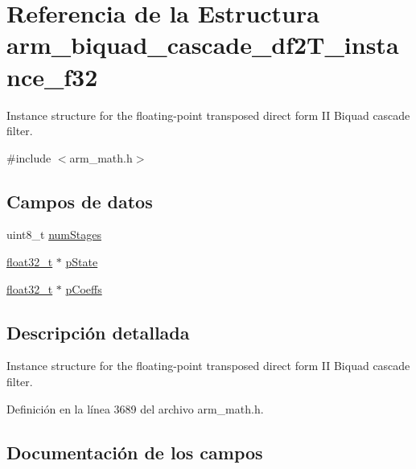 \hypertarget{structarm__biquad__cascade__df2_t__instance__f32}{}\section{Referencia de la Estructura arm\+\_\+biquad\+\_\+cascade\+\_\+df2\+T\+\_\+instance\+\_\+f32}
\label{structarm__biquad__cascade__df2_t__instance__f32}


Instance structure for the floating-\/point transposed direct form II Biquad cascade filter.  




{\ttfamily \#include $<$arm\+\_\+math.\+h$>$}

\subsection*{Campos de datos}
\begin{DoxyCompactItemize}
\item 
uint8\+\_\+t \hyperlink{structarm__biquad__cascade__df2_t__instance__f32_a3615af038f56917909e0370c11bc2ec7}{num\+Stages}
\item 
\hyperlink{arm__math_8h_a4611b605e45ab401f02cab15c5e38715}{float32\+\_\+t} $\ast$ \hyperlink{structarm__biquad__cascade__df2_t__instance__f32_a335c87e6fdc4b96601d95a5de8b9c463}{p\+State}
\item 
\hyperlink{arm__math_8h_a4611b605e45ab401f02cab15c5e38715}{float32\+\_\+t} $\ast$ \hyperlink{structarm__biquad__cascade__df2_t__instance__f32_aacbb8dd8eeba4b21fc2bb40076405ee3}{p\+Coeffs}
\end{DoxyCompactItemize}


\subsection{Descripción detallada}
Instance structure for the floating-\/point transposed direct form II Biquad cascade filter. 

Definición en la línea 3689 del archivo arm\+\_\+math.\+h.



\subsection{Documentación de los campos}

